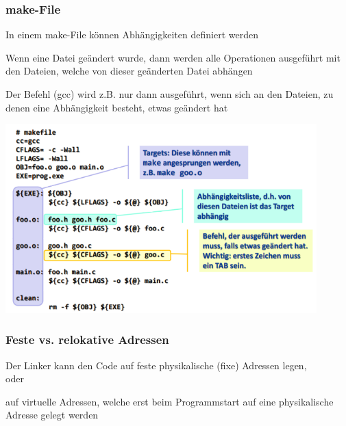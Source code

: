 			\subsubsection{make-File}
				\begin{minipage}[c]{9 cm}
					\vspace*{-1.0cm}
					\begin{compactitem}
						\item In einem make-File können Abhängigkeiten definiert werden
						\item Wenn eine Datei geändert wurde, dann werden alle Operationen ausgeführt
						mit den Dateien, welche von dieser geänderten Datei abhängen 
						\item Der Befehl (gcc) wird z.B. nur dann ausgeführt, wenn sich an den Dateien, zu
						denen eine Abhängigkeit besteht, etwas geändert hat
					\end{compactitem}
				\end{minipage}
				\hspace*{0.5cm}
				\begin{minipage}[c]{9 cm}
					\vspace*{-0.6cm}
					\includegraphics[width=0.9\textwidth]{pics/make_File.png}
				\end{minipage}
				\subsubsection{Feste vs. relokative Adressen}
					\begin{compactitem}
						\item Der Linker kann den Code auf feste physikalische (fixe) Adressen legen,\\
						oder
						\item auf virtuelle Adressen, welche erst beim Programmstart auf eine physikalische
						Adresse gelegt werden
					\end{compactitem}		
\newpage	
